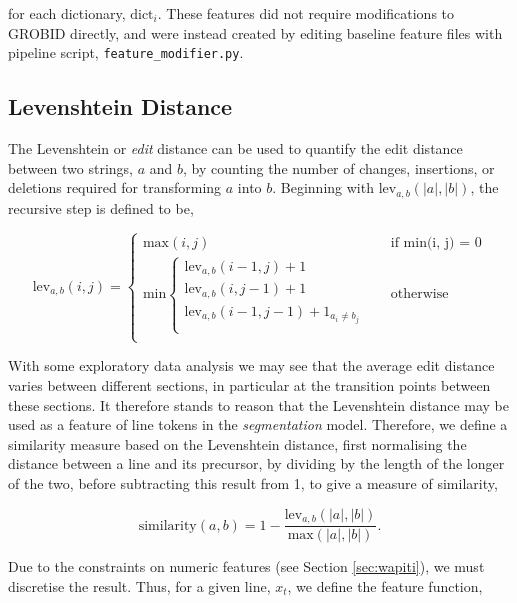 for each dictionary, $\text{dict}_i$. These features did not require modifications to GROBID directly, and were instead created by editing baseline feature files with pipeline script, \texttt{feature\_modifier.py}.

\subsection{Levenshtein Distance}

The Levenshtein or \emph{edit} distance can be used to quantify the edit distance between two strings, $a$ and $b$, by counting the number of changes, insertions, or deletions required for transforming $a$ into $b$. Beginning with $\text{lev}_{a, b}(|a|, |b|)$, the recursive step is defined to be,

\begin{equation}
  \text{lev}_{a, b}(i, j) = 
  \begin{cases} 
  	\text{max}(i, j) &\quad\text{if min(i, j) = 0} \\
	\text{min}
		\begin{cases}
			\text{lev}_{a, b}(i - 1, j) + 1 \\
			\text{lev}_{a, b}(i, j - 1) + 1 \\
			\text{lev}_{a, b}(i - 1, j - 1) + 1_{a_i \neq b_j} \\
		\end{cases} &\quad\text{otherwise} \\
  \end{cases}
\label{eq:levenshtein}
\end{equation}

With some exploratory data analysis we may see that the average edit distance varies between different sections, in particular at the transition points between these sections. It therefore stands to reason that the Levenshtein distance may be used as a feature of line tokens in the \emph{segmentation} model. Therefore, we define a similarity measure based on the Levenshtein distance, first normalising the distance between a line and its precursor, by dividing by the length of the longer of the two, before subtracting this result from 1, to give a measure of similarity,

\begin{equation}
\text{similarity}(a, b) = 1 - \frac{\text{lev}_{a, b}(|a|, |b|)}{\text{max}(|a|, |b|)}.
\label{eq:levenshteinsimilarity}
\end{equation}

Due to the constraints on numeric features (see Section \ref{sec:wapiti}), we must discretise the result. Thus, for a given line, $x_t$, we define the feature function, 

